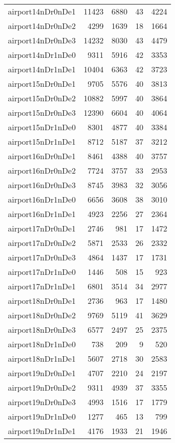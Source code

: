 \begin{longtable}{lrrrr}
airport14nDr0nDe1 & 11423 & 6880 & 43 & 4224 \\
airport14nDr0nDe2 & 4299 & 1639 & 18 & 1664 \\
airport14nDr0nDe3 & 14232 & 8030 & 43 & 4479 \\
airport14nDr1nDe0 & 9311 & 5916 & 42 & 3353 \\
airport14nDr1nDe1 & 10404 & 6363 & 42 & 3723 \\
airport15nDr0nDe1 & 9705 & 5576 & 40 & 3813 \\
airport15nDr0nDe2 & 10882 & 5997 & 40 & 3864 \\
airport15nDr0nDe3 & 12390 & 6604 & 40 & 4064 \\
airport15nDr1nDe0 & 8301 & 4877 & 40 & 3384 \\
airport15nDr1nDe1 & 8712 & 5187 & 37 & 3212 \\
airport16nDr0nDe1 & 8461 & 4388 & 40 & 3757 \\
airport16nDr0nDe2 & 7724 & 3757 & 33 & 2953 \\
airport16nDr0nDe3 & 8745 & 3983 & 32 & 3056 \\
airport16nDr1nDe0 & 6656 & 3608 & 38 & 3010 \\
airport16nDr1nDe1 & 4923 & 2256 & 27 & 2364 \\
airport17nDr0nDe1 & 2746 & 981 & 17 & 1472 \\
airport17nDr0nDe2 & 5871 & 2533 & 26 & 2332 \\
airport17nDr0nDe3 & 4864 & 1437 & 17 & 1731 \\
airport17nDr1nDe0 & 1446 & 508 & 15 & 923 \\
airport17nDr1nDe1 & 6801 & 3514 & 34 & 2977 \\
airport18nDr0nDe1 & 2736 & 963 & 17 & 1480 \\
airport18nDr0nDe2 & 9769 & 5119 & 41 & 3629 \\
airport18nDr0nDe3 & 6577 & 2497 & 25 & 2375 \\
airport18nDr1nDe0 & 738 & 209 & 9 & 520 \\
airport18nDr1nDe1 & 5607 & 2718 & 30 & 2583 \\
airport19nDr0nDe1 & 4707 & 2210 & 24 & 2197 \\
airport19nDr0nDe2 & 9311 & 4939 & 37 & 3355 \\
airport19nDr0nDe3 & 4993 & 1516 & 17 & 1779 \\
airport19nDr1nDe0 & 1277 & 465 & 13 & 799 \\
airport19nDr1nDe1 & 4176 & 1933 & 21 & 1946 \\

\end{longtable}
